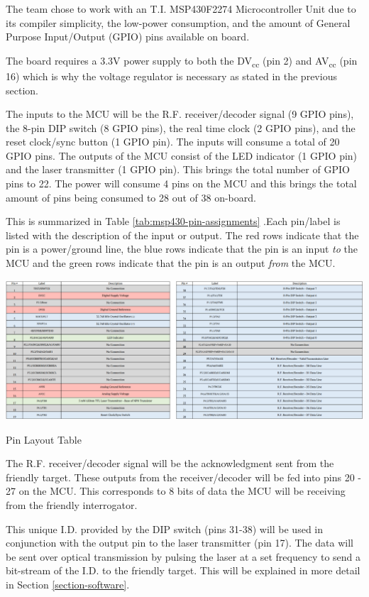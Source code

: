 \documentclass[letterpaper,10pt]{article}
\begin{document}
\begin{spacing}{1.15}
The team chose to work with an T.I. MSP430F2274 Microcontroller Unit due to its compiler simplicity, the low-power consumption, and the amount of General Purpose Input/Output (GPIO) pins available on board.

The board requires a 3.3V power supply to both the DV\textsubscript{cc} (pin 2) and AV\textsubscript{cc} (pin 16) which is why the voltage regulator is necessary as stated in the previous section. 

The inputs to the MCU will be the R.F. receiver/decoder signal (9 GPIO pins), the 8-pin DIP switch (8 GPIO pins), the real time clock (2 GPIO pins), and the reset clock/sync button (1 GPIO pin). The inputs will consume a total of 20 GPIO pins. The outputs of the MCU consist of the LED indicator (1 GPIO pin) and the laser transmitter (1 GPIO pin). This brings the total number of GPIO pins to 22. The power will consume 4 pins on the MCU and this brings the total amount of pins being consumed to 28 out of 38 on-board. 

This is summarized in Table \ref{tab:msp430-pin-assignments} .Each pin/label is listed with the description of the input or output. The red rows indicate that the pin is a power/ground line, the blue rows indicate that the pin is an input \textit{to} the MCU and the green rows indicate that the pin is an output \textit{from} the MCU.

\begin{table} [H]
	\centering
	\includegraphics[scale=0.37]{MSP430_Pin_Assignments_Interrogator.png}
	\caption{Pin Layout Table\label{tab:msp430-pin-assignments}}
\end{table}

The R.F. receiver/decoder signal will be the acknowledgment sent from the friendly target. These outputs from the receiver/decoder will be fed into pins 20 - 27 on the MCU. This corresponds to 8 bits of data the MCU will be receiving from the friendly interrogator.

This unique I.D. provided by the DIP switch (pins 31-38) will be used in conjunction with the output pin to the laser transmitter (pin 17). The data will be sent over optical transmission by pulsing the laser at a set frequency to send a bit-stream of the I.D. to the friendly target. This will be explained in more detail in Section \ref{section-software}.


\end{spacing}
\end{document}
